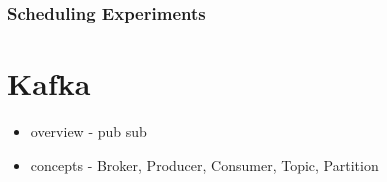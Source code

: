 \subsubsection{Scheduling Experiments}

\section{Kafka} \label{background-kafka}

\begin{itemize}
	\item overview - pub sub
	\item concepts - Broker, Producer, Consumer, Topic, Partition
\end{itemize}

